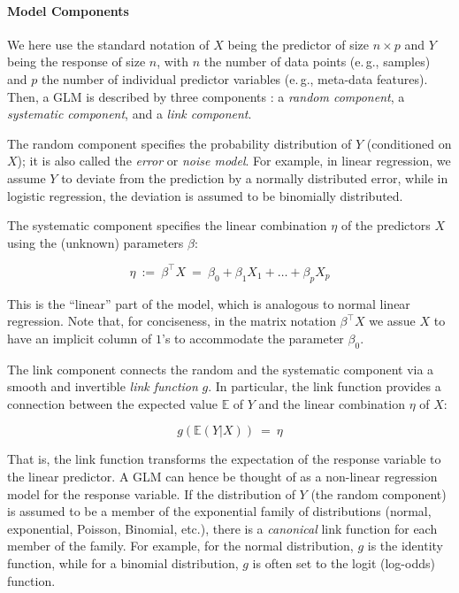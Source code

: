 \paragraph{Model Components}
\label{sec:Factorization:sub:Methods:sub:GLMs:par:Overview}

We here use the standard notation of $X$ being the predictor of size $n \times p$ and $Y$ being the response of size $n$,
with $n$ the number of data points (e.\,g., samples)
and $p$ the number of individual predictor variables (e.\,g., meta-data features).
Then, a \ac{GLM} is described by three components \cite{McCullagh1989}:
a \emph{random component}, a \emph{systematic component}, and a \emph{link component}.

The random component specifies the probability distribution of $Y$ (conditioned on $X$);
it is also called the \emph{error} or \emph{noise model}.
For example, in linear regression, we assume $Y$ to deviate from the prediction by a normally distributed error,
while in logistic regression, the deviation is assumed to be binomially distributed.

The systematic component specifies the linear combination $\eta$ of the predictors $X$
using the (unknown) parameters $\beta$:

\begin{equation}
\label{sec:Factorization:sub:GLM:eq:eta}
    \eta ~:=~ \beta^\intercal X ~=~ \beta_0 + \beta_1 X_1 + \dots + \beta_p X_p
\end{equation}

This is the ``linear'' part of the model, which is analogous to normal linear regression.
Note that, for conciseness, in the matrix notation $\beta^\intercal X$ we assue $X$ to have
an implicit column of $1$'s to accommodate the parameter $\beta_0$.

The link component connects the random and the systematic component via a smooth and invertible \emph{link function} $g$.
In particular, the link function provides a connection between the expected value $\mathbb{E}$ of $Y$
and the linear combination $\eta$ of $X$:

\begin{equation}
\label{sec:Factorization:sub:GLM:eq:link}
    g(\mathbb{E}(Y|X)) ~=~ \eta
\end{equation}

That is, the link function transforms the expectation of the response variable to the linear predictor.
A \ac{GLM} can hence be thought of as a non-linear regression model for the response variable.
If the distribution of $Y$ (the random component) is assumed
to be a member of the exponential family of distributions (normal, exponential, Poisson, Binomial, etc.),
there is a \emph{canonical} link function for each member of the family.
For example, for the normal distribution, $g$ is the identity function,
while for a binomial distribution, $g$ is often set to the logit (log-odds) function.

